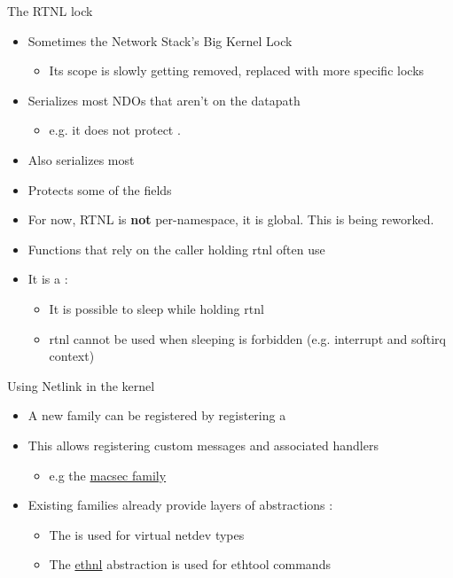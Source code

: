 \begin{frame}{The RTNL lock}
	\begin{itemize}
		\item Sometimes the Network Stack's Big Kernel Lock
			\begin{itemize}
				\item Its scope is slowly getting removed, replaced with more specific locks
			\end{itemize}
		\item Serializes most NDOs that aren't on the datapath
			\begin{itemize}
				\item e.g. it does not protect .
			\end{itemize}
		\item Also serializes most 
		\item Protects some of the  fields
		\item For now, RTNL is \textbf{not} per-namespace, it is global. This is being reworked.
		\item Functions that rely on the caller holding rtnl often use 
		\item It is a  :
			\begin{itemize}
				\item It is possible to sleep while holding rtnl
				\item rtnl cannot be used when sleeping is forbidden (e.g. interrupt and softirq context)
			\end{itemize}
	\end{itemize}
\end{frame}

\begin{frame}{Using Netlink in the kernel}
	\begin{itemize}
		\item A new family can be registered by registering a 
		\item This allows registering custom messages and associated handlers
			\begin{itemize}
				\item e.g the \href{https://elixir.bootlin.com/linux/v6.15.2/source/drivers/net/macsec.c\#L3360}{macsec family}
			\end{itemize}
		\item Existing families already provide layers of abstractions :
			\begin{itemize}
				\item The  is used for virtual netdev types
				\item The \href{https://elixir.bootlin.com/linux/v6.15.2/source/net/ethtool}{ethnl} abstraction is used for ethtool commands
			\end{itemize}
	\end{itemize}
\end{frame}

